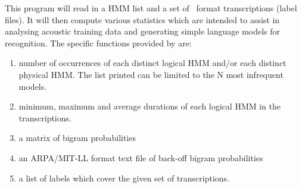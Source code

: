 %
%

\newpage
{}


This program will read in a HMM list and 
a set of \HTK\ format transcriptions (label files).  It will then 
compute various statistics which are intended to assist in 
analysing acoustic training data and generating simple language
models for recognition.  The specific functions provided by 
are:
\begin{enumerate}
\item number of occurrences of each distinct 
      logical HMM and/or each distinct physical HMM.  The list printed
      can be limited to the N most infrequent models.
\item minimum, maximum and average durations of each logical HMM
      in the transcriptions.
\item a matrix of bigram probabilities
\item an ARPA/MIT-LL format text file of back-off bigram probabilities
\item a list of labels which cover the given set of transcriptions.
\end{enumerate}

